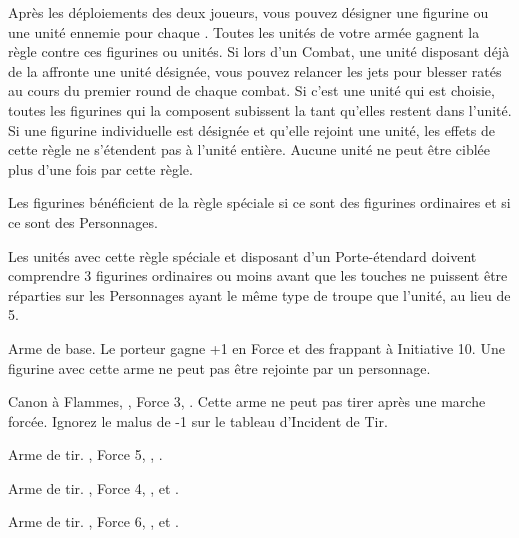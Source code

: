 Après les déploiements des deux joueurs, vous pouvez désigner une figurine ou une unité ennemie pour chaque \ancientgrudge. Toutes les unités de votre armée gagnent la règle \hatred contre ces figurines ou unités. Si lors d'un Combat, une unité disposant déjà de la \hatred affronte une unité désignée, vous pouvez relancer les jets pour blesser ratés au cours du premier round de chaque combat. Si c’est une unité qui est choisie, toutes les figurines qui la composent subissent la \hatred tant qu’elles restent dans l’unité. Si une figurine individuelle est désignée et qu'elle rejoint une unité, les effets de cette règle ne s’étendent pas à l’unité entière. Aucune unité ne peut être ciblée plus d'une fois par cette règle.

\armyspecialruleentry{\sonsoftheavalanche}

Les figurines  bénéficient de la règle spéciale  si ce sont des figurines ordinaires et  si ce sont des Personnages.


\armyspecialruleentry{\scraplinglookout}

Les unités avec cette règle spéciale et disposant d'un Porte-étendard doivent comprendre 3 figurines ordinaires ou moins avant que les touches ne puissent être réparties sur les Personnages ayant le même type de troupe que l'unité, au lieu de 5.

\closearmyspecialrules

\vspace*{1.5cm}
\startarmyarmoury

\startitemlistonecol

\listitemonecol{\whirlingchainsofdoom} Arme de base. Le porteur gagne +1 en Force et des  frappant à Initiative 10. Une figurine avec cette arme ne peut pas être rejointe par un personnage.

\listitemonecol{\flameculverin} Canon à Flammes, , Force 3, \flamingattacks. Cette arme ne peut pas tirer après une marche forcée. Ignorez le malus de -1 sur le tableau d'Incident de Tir.

\listitemonecol{\forgegun} Arme de tir. , Force 5, \flamingattacks, \quicktofire.

\listitemonecol{\swiwelgun} Arme de tir. , Force 4, ,   et \quicktofire.

\listitemonecol{\wyrmslayerrocket} Arme de tir. , Force 6, \flamingattacks,  et \reload{}.

